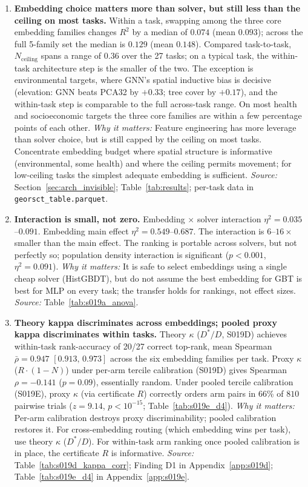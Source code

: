 \documentclass{article}
\begin{document}
\begin{enumerate}
\item \textbf{Embedding choice matters more than solver, but still less than the ceiling on most tasks.}
Within a task, swapping among the three core embedding families changes $R^2$ by a median of $0.074$ (mean $0.093$); across the full 5-family set the median is $0.129$ (mean $0.148$). Compared task-to-task, $N_{\text{ceiling}}$ spans a range of $0.36$ over the 27 tasks; on a typical task, the within-task architecture step is the smaller of the two. The exception is environmental targets, where GNN's spatial inductive bias is decisive (elevation: GNN beats PCA32 by $+0.33$; tree cover by $+0.17$), and the within-task step is comparable to the full across-task range. On most health and socioeconomic targets the three core families are within a few percentage points of each other.
\emph{Why it matters:} Feature engineering has more leverage than solver choice, but is still capped by the ceiling on most tasks. Concentrate embedding budget where spatial structure is informative (environmental, some health) and where the ceiling permits movement; for low-ceiling tasks the simplest adequate embedding is sufficient.
\emph{Source:} Section~\ref{sec:arch_invisible}; Table~\ref{tab:results}; per-task data in \texttt{georsct\_table.parquet}.

\item \textbf{Interaction is small, not zero.}
Embedding $\times$ solver interaction $\eta^2 = 0.035$--$0.091$. Embedding main effect $\eta^2 = 0.549$--$0.687$. The interaction is $6$--$16{\times}$ smaller than the main effect. The ranking is portable across solvers, but not perfectly so; population density interaction is significant ($p < 0.001$, $\eta^2 = 0.091$).
\emph{Why it matters:} It is safe to select embeddings using a single cheap solver (HistGBDT), but do not assume the best embedding for GBT is best for MLP on every task; the transfer holds for rankings, not effect sizes.
\emph{Source:} Table~\ref{tab:s019a_anova}.

\item \textbf{Theory kappa discriminates across embeddings; pooled proxy kappa discriminates within tasks.}
Theory $\kappa$ ($D^*/D$, S019D) achieves within-task rank-accuracy of 20/27 correct top-rank, mean Spearman $\bar{\rho} = 0.947$ $[0.913,\, 0.973]$ across the six embedding families per task. Proxy $\kappa$ ($R{\cdot}(1{-}N)$) under per-arm tercile calibration (S019D) gives Spearman $\rho = -0.141$ ($p = 0.09$), essentially random. Under pooled tercile calibration (S019E), proxy $\kappa$ (via certificate $R$) correctly orders arm pairs in 66\% of $810$ pairwise trials ($z = 9.14$, $p < 10^{-15}$; Table~\ref{tab:s019e_d4}).
\emph{Why it matters:} Per-arm calibration destroys proxy discriminability; pooled calibration restores it. For cross-embedding routing (which embedding wins per task), use theory $\kappa$ ($D^*/D$). For within-task arm ranking once pooled calibration is in place, the certificate $R$ is informative.
\emph{Source:} Table~\ref{tab:s019d_kappa_corr}; Finding D1 in Appendix~\ref{app:s019d}; Table~\ref{tab:s019e_d4} in Appendix~\ref{app:s019e}.


\end{enumerate}
\end{document}
